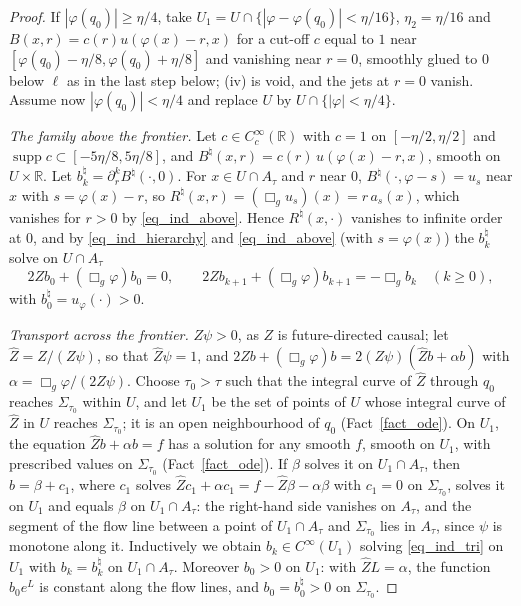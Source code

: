 \documentclass[11pt,a4paper,reqno]{amsart}
\theoremstyle{definition}
\numberwithin{equation}{section}
\newcommand{\R}{\mathbb{R}}
\newcommand{\supp}{\operatorname{supp}}
\begin{document}
\begin{proof}
If $|\varphi(q_0)|\ge\eta/4$, take $U_1=U\cap\{|\varphi-\varphi(q_0)|<\eta/16\}$, $\eta_2=\eta/16$ and
$B(x,r)=c(r)u(\varphi(x)-r,x)$ for a cut-off $c$ equal to $1$ near $[\varphi(q_0)-\eta/8,\varphi(q_0)+\eta/8]$ and vanishing
near $r=0$, smoothly glued to $0$ below $\ell$ as in the last step below; (iv) is void, and the jets at $r=0$ vanish. Assume
now $|\varphi(q_0)|<\eta/4$ and replace $U$ by $U\cap\{|\varphi|<\eta/4\}$.

\emph{The family above the frontier.} Let $c\in C_c^\infty(\R)$ with $c=1$ on $[-\eta/2,\eta/2]$ and
$\supp c\subset[-5\eta/8,5\eta/8]$, and $B^\natural(x,r)=c(r)\,u(\varphi(x)-r,x)$, smooth on $U\times\R$. Let
$b^\natural_k=\partial_r^kB^\natural(\cdot,0)$. For $x\in U\cap A_\tau$ and $r$ near $0$,
$B^\natural(\cdot,\varphi-s)=u_s$ near $x$ with $s=\varphi(x)-r$, so $R^\natural(x,r)=(\Box_gu_s)(x)=r\,a_s(x)$, which
vanishes for $r>0$ by \eqref{eq_ind_above}. Hence $R^\natural(x,\cdot)$ vanishes to infinite order at $0$, and by
\eqref{eq_ind_hierarchy} and \eqref{eq_ind_above} (with $s=\varphi(x)$) the $b^\natural_k$ solve on $U\cap A_\tau$
\begin{equation}\label{eq_ind_tri}
2Zb_0+(\Box_g\varphi)b_0=0,\qquad 2Zb_{k+1}+(\Box_g\varphi)b_{k+1}=-\Box_gb_k\quad(k\ge0),
\end{equation}
with $b^\natural_0=u_{\varphi}(\cdot)>0$.

\emph{Transport across the frontier.} $Z\psi>0$, as $Z$ is future-directed causal; let $\hat Z=Z/(Z\psi)$, so that
$\hat Z\psi=1$, and $2Zb+(\Box_g\varphi)b=2(Z\psi)(\hat Zb+\alpha b)$ with $\alpha=\Box_g\varphi/(2Z\psi)$. Choose
$\tau_0>\tau$ such that the integral curve of $\hat Z$ through $q_0$ reaches $\Sigma_{\tau_0}$ within $U$, and let $U_1$ be
the set of points of $U$ whose integral curve of $\hat Z$ in $U$ reaches $\Sigma_{\tau_0}$; it is an open neighbourhood of
$q_0$ (Fact~\ref{fact_ode}). On $U_1$, the equation $\hat Zb+\alpha b=f$ has a solution for any smooth $f$, smooth on $U_1$,
with prescribed values on $\Sigma_{\tau_0}$ (Fact~\ref{fact_ode}). If $\beta$ solves it on $U_1\cap A_\tau$, then
$b=\beta+c_1$, where $c_1$ solves $\hat Zc_1+\alpha c_1=f-\hat Z\beta-\alpha\beta$ with $c_1=0$ on $\Sigma_{\tau_0}$, solves
it on $U_1$ and equals $\beta$ on $U_1\cap A_\tau$: the right-hand side vanishes on $A_\tau$, and the segment of the flow
line between a point of $U_1\cap A_\tau$ and $\Sigma_{\tau_0}$ lies in $A_\tau$, since $\psi$ is monotone along it.
Inductively we obtain $b_k\in C^\infty(U_1)$ solving \eqref{eq_ind_tri} on $U_1$ with $b_k=b^\natural_k$ on
$U_1\cap A_\tau$. Moreover $b_0>0$ on $U_1$: with $\hat ZL=\alpha$, the function $b_0e^L$ is constant along the flow lines,
and $b_0=b^\natural_0>0$ on $\Sigma_{\tau_0}$.


\end{proof}
\end{document}
